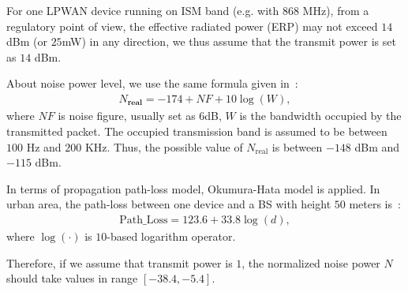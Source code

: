 For one LPWAN device running on ISM band (e.g. with 868 MHz), from a regulatory point of view, the effective radiated power (ERP) may not exceed $14$ dBm (or $25$mW) in any direction, we thus assume that the transmit power is set as $14$ dBm.

About noise power level, we use the same formula given in~\cite{georgiou2017low}:
\begin{align}
	N_{\textbf{real}} = -174 + NF + 10\log(W) ,
\end{align}
where $NF$ is noise figure, usually set as $6$dB, $W$ is the bandwidth occupied by the transmitted packet. The occupied transmission band is assumed to be between $100$ Hz and $200$ KHz. Thus, the possible value of $N_{\text{real}}$ is between $-148$ dBm and $-115$ dBm.

In terms of propagation path-loss model, Okumura-Hata model is applied. In urban area, the path-loss between one device and a BS with height $50$ meters is~\cite{lagrange2000reseaux}:  
\begin{align}
	\text{Path_Loss}= 123.6+33.8\log(d),
\end{align}
where $\log(\cdot)$ is $10$-based logarithm operator.

Therefore, if we assume that transmit power is $1$, the normalized noise power $N$ should take values in range $\left[ -38.4, -5.4\right] $. 




